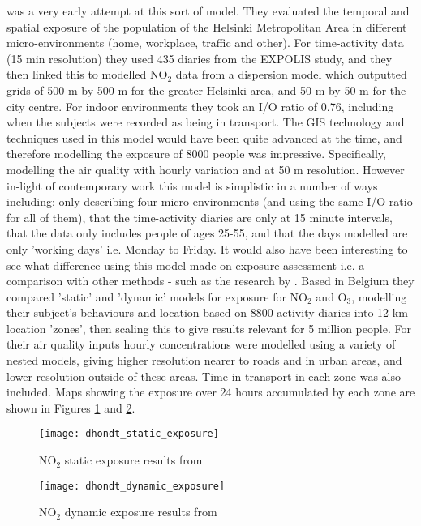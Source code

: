 \cite{Kousa2002} was a very early attempt at this sort of model. They evaluated the temporal and spatial exposure of the population of the Helsinki Metropolitan Area in different micro-environments (home, workplace, traffic and other). For time-activity data (15 min resolution) they used 435 diaries from the EXPOLIS study, and they then linked this to modelled NO$_{2}$ data from a dispersion model which outputted grids of 500 m by 500 m for the greater Helsinki area, and 50 m by 50 m for the city centre. For indoor environments they took an I/O ratio of 0.76, including when the subjects were recorded as being in transport. The GIS technology and techniques used in this model would have been quite advanced at the time, and therefore modelling the exposure of 8000 people was impressive. Specifically, modelling the air quality with hourly variation and at 50 m resolution. However in-light of contemporary work this model is simplistic in a number of ways including: only describing four micro-environments (and using the same I\slash O ratio for all of them), that the time-activity diaries are only at 15 minute intervals, that the data only includes people of ages 25-55, and that the days modelled are only 'working days' i.e. Monday to Friday. It would also have been interesting to see what difference using this model made on exposure assessment i.e. a comparison with other methods - such as the research by \cite{Dhondt2012}. Based in Belgium they compared 'static' and 'dynamic' models for exposure for NO$_{2}$ and O$_{3}$, modelling their subject's behaviours and location based on 8800 activity diaries into 12 km location 'zones', then scaling this to give results relevant for 5 million people. For their air quality inputs hourly concentrations were modelled using a variety of nested models, giving higher resolution nearer to roads and in urban areas, and lower resolution outside of these areas. Time in transport in each zone was also included. Maps showing the exposure over 24 hours accumulated by each zone are shown in Figures \ref{fig:dhondt_static_exposure} and \ref{fig:dhondt_dynamic_exposure}.

\begin{figure}[H]
\centering
\texttt{[image: dhondt\_static\_exposure]}
\caption{NO$_{2}$ static exposure results from \cite{Dhondt2012}}
\label{fig:dhondt_static_exposure}
\end{figure}

\begin{figure}[H]
\centering
\texttt{[image: dhondt\_dynamic\_exposure]}
\caption{NO$_{2}$ dynamic exposure results from \cite{Dhondt2012}}
\label{fig:dhondt_dynamic_exposure}
\end{figure}

